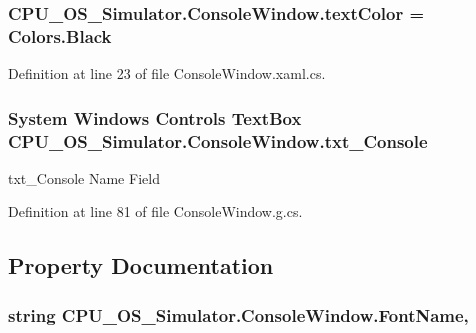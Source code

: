 \subsubsection[{text\+Color}]{ C\+P\+U\+\_\+\+O\+S\+\_\+\+Simulator.\+Console\+Window.\+text\+Color = Colors.\+Black\hspace{0.3cm}{\ttfamily [private]}}\label{class_c_p_u___o_s___simulator_1_1_console_window_a155c42bee25bd537a2656828bdf6f527}


Definition at line 23 of file Console\+Window.\+xaml.\+cs.

\hypertarget{class_c_p_u___o_s___simulator_1_1_console_window_ad1d4a0c5f573c7e89c8d6ed57d5097e0}{}
\subsubsection[{txt\+\_\+\+Console}]{\setlength{\rightskip}{0pt plus 5cm}System Windows Controls Text\+Box C\+P\+U\+\_\+\+O\+S\+\_\+\+Simulator.\+Console\+Window.\+txt\+\_\+\+Console}\label{class_c_p_u___o_s___simulator_1_1_console_window_ad1d4a0c5f573c7e89c8d6ed57d5097e0}


txt\+\_\+\+Console Name Field 



Definition at line 81 of file Console\+Window.\+g.\+cs.



\subsection{Property Documentation}
\hypertarget{class_c_p_u___o_s___simulator_1_1_console_window_a752c6bed63b2368b26a4287a2902ef61}{}
\subsubsection[{Font\+Name}]{\setlength{\rightskip}{0pt plus 5cm}string C\+P\+U\+\_\+\+O\+S\+\_\+\+Simulator.\+Console\+Window.\+Font\+Name\hspace{0.3cm}{\ttfamily [get]}, {\ttfamily [set]}}\label{class_c_p_u___o_s___simulator_1_1_console_window_a752c6bed63b2368b26a4287a2902ef61}


